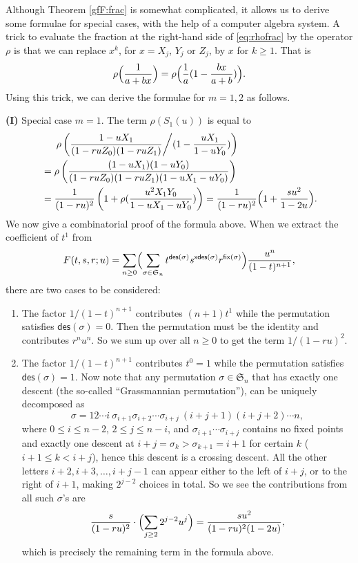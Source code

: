 \documentclass[12pt]{amsart} %
\numberwithin{equation}{section}
\theoremstyle{plain}
\theoremstyle{definition}
\def\xdes{\mathsf{xdes}}
\def\fix{\mathsf{fix}}
\def\des{\mathsf{des}}
\def\S{\mathfrak{S}}
\begin{document}
Although Theorem \ref{gfF:frac} is somewhat complicated, it allows us to derive some 
formulae for special cases, with the help of a computer algebra system.
A trick to evaluate the fraction at the right-hand side of \eqref{eq:rhofrac} by the operator $\rho$ is that we can replace $x^k$, for $x=X_j$,  $Y_j$ or $Z_j$, by $x$ for $k\geq 1$. That is
\begin{equation}\label{rho:trick}
\rho\Bigl(\frac{1}{a+bx}\Bigr) = \rho\Bigl(\frac{1}{a}(1-\frac{bx}{a+b})\Bigr).
\end{equation}
Using this trick, we can derive the formulae for $m=1,2$ as follows. 

{\bf (I)} Special case $m=1$. The term $\rho(S_1(u))$ is equal to 
\begin{align*}
	&\phantom{==}\rho\left( \frac{1-uX_1}{(1-ruZ_0)(1-ruZ_1)} \middle/ {(1- \frac{u X_1}{ 1-uY_0})} \right)  \\
	&=
	\rho\left( \frac{(1-uX_1)(1-uY_0)}{(1-ruZ_0)(1-ruZ_1) (1- u X_1-uY_0) }\right)\\
	&=
	\frac{1}{(1-ru)^2}\left(1 + \rho( \frac{u^2X_1Y_0}{1- u X_1-uY_0})\right)= \frac{1}{(1-ru)^2}
	\Bigl(1 + \frac{su^2}{ 1- 2u}\Bigr).
\end{align*}
We now give a combinatorial proof of the formula above. When we extract the coefficient of $t^1$ from \begin{equation*}
F(t,s,r; u)=\sum_{n\geq 0} \Bigl( \sum_{\sigma\in \S_n} 
	 t^{\des(\sigma)}  s^{\xdes(\sigma)} r^{\fix(\sigma)}\Bigr) \frac {u^n}{(1-t)^{n+1}},
\end{equation*} 
there are two cases to be considered:
\begin{enumerate}
	\item The factor $1/{(1-t)^{n+1}}$ contributes $(n+1)t^1$ while the permutation satisfies $\des(\sigma)=0$. Then the permutation must be the identity and contributes $r^nu^n$. So we sum up over all $n\ge 0$ to get the term $1/{(1-ru)^2}$.
	\item The factor $1/{(1-t)^{n+1}}$ contributes $t^0=1$ while the permutation satisfies $\des(\sigma)=1$. Now note that any permutation $\sigma\in\S_n$ that has exactly one descent (the so-called ``Grassmannian permutation''), can be uniquely decomposed as $$\sigma=12\cdots i~\sigma_{i+1}\sigma_{i+2}\cdots\sigma_{i+j}~(i+j+1)(i+j+2)\cdots n,$$
	where $0\le i \le n-2$, $2\le j\le n-i$, and $\sigma_{i+1}\cdots\sigma_{i+j}$ contains no fixed points and exactly one descent at $i+j=\sigma_{k}>\sigma_{k+1}=i+1$ for certain $k$ ($i+1\le k<i+j$), hence this descent is a crossing descent. All the other letters $i+2,i+3,\ldots,i+j-1$ can appear either to the left of $i+j$, or to the right of $i+1$, making $2^{j-2}$ choices in total. So we see the contributions from all such $\sigma$'s are
	$$\frac{s}{(1-ru)^2}\cdot \Bigl(\sum_{j\ge 2}2^{j-2}u^j\Bigr)=\frac{su^2}{(1-ru)^2(1-2u)},$$
	which is precisely the remaining term in the formula above.
\end{enumerate}
 
\end{document}
